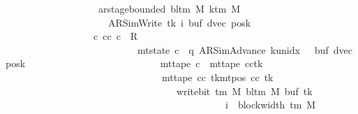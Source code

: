 \begin{isabellebody}
\ \ \ \ \ \ \ \ \ \ \ \ \ \ \ \ \ \ \ ar{\isacharunderscore}{\kern0pt}stage{\isacharunderscore}{\kern0pt}bounded\ {\isacharparenleft}{\kern0pt}bl{\isacharunderscore}{\kern0pt}tm\ M{\isacharparenright}{\kern0pt}\ {\isacharparenleft}{\kern0pt}k{\isacharunderscore}{\kern0pt}tm\ M{\isacharparenright}{\kern0pt}\isanewline
\ \ \ \ \ \ \ \ \ \ \ \ \ \ \ \ \ \ \ \ \ {\isacharparenleft}{\kern0pt}AR{\isacharunderscore}{\kern0pt}SimWrite{\isacharcomma}{\kern0pt}\ tk{\isacharcomma}{\kern0pt}\ i{\isacharcomma}{\kern0pt}\ buf{\isacharcomma}{\kern0pt}\ dvec{\isacharcomma}{\kern0pt}\ posk{\isacharparenright}{\kern0pt}\ {\isasymrbrakk}\isanewline
\ \ \ \ \ \ \ \ \ \ \ \ \ \ \ \ \ {\isasymLongrightarrow}\ {\isasymexists}c{\isacharprime}{\kern0pt}{\isacharprime}{\kern0pt}{\isachardot}{\kern0pt}\ {\isacharparenleft}{\kern0pt}cc{\isacharcomma}{\kern0pt}\ c{\isacharprime}{\kern0pt}{\isacharprime}{\kern0pt}{\isacharparenright}{\kern0pt}\ {\isasymin}\ R{\isacharprime}{\kern0pt}\isanewline
\ \ \ \ \ \ \ \ \ \ \ \ \ \ \ \ \ \ \ \ \ \ \ \ \ \ {\isasymand}\ mt{\isacharunderscore}{\kern0pt}state\ c{\isacharprime}{\kern0pt}{\isacharprime}{\kern0pt}\ {\isacharequal}{\kern0pt}\ {\isacharparenleft}{\kern0pt}q{\isacharcomma}{\kern0pt}\ AR{\isacharunderscore}{\kern0pt}SimAdvance{\isacharcomma}{\kern0pt}\ k{\isacharunderscore}{\kern0pt}unidx\ {}{\isacharcomma}{\kern0pt}\ {}{\isacharcomma}{\kern0pt}\ buf{\isacharcomma}{\kern0pt}\ dvec{\isacharcomma}{\kern0pt}\ posk{\isacharparenright}{\kern0pt}\isanewline
\ \ \ \ \ \ \ \ \ \ \ \ \ \ \ \ \ \ \ \ \ \ \ \ \ \ {\isasymand}\ mt{\isacharunderscore}{\kern0pt}tape\ c{\isacharprime}{\kern0pt}{\isacharprime}{\kern0pt}\ {\isacharequal}{\kern0pt}\ {\isacharparenleft}{\kern0pt}mt{\isacharunderscore}{\kern0pt}tape\ cc{\isacharparenright}{\kern0pt}{\isacharparenleft}{\kern0pt}tk\ {\isacharcolon}{\kern0pt}{\isacharequal}{\kern0pt}\isanewline
\ \ \ \ \ \ \ \ \ \ \ \ \ \ \ \ \ \ \ \ \ \ \ \ \ \ \ \ \ \ \ \ {\isacharparenleft}{\kern0pt}mt{\isacharunderscore}{\kern0pt}tape\ cc\ tk{\isacharparenright}{\kern0pt}{\isacharparenleft}{\kern0pt}mt{\isacharunderscore}{\kern0pt}pos\ cc\ tk\ {\isacharcolon}{\kern0pt}{\isacharequal}{\kern0pt}\isanewline
\ \ \ \ \ \ \ \ \ \ \ \ \ \ \ \ \ \ \ \ \ \ \ \ \ \ \ \ \ \ \ \ \ \ \ write{\isacharunderscore}{\kern0pt}bit\ {\isacharparenleft}{\kern0pt}{\isasymGamma}{\isacharunderscore}{\kern0pt}tm\ M{\isacharparenright}{\kern0pt}\ {\isacharparenleft}{\kern0pt}bl{\isacharunderscore}{\kern0pt}tm\ M{\isacharparenright}{\kern0pt}\ {\isacharparenleft}{\kern0pt}buf\ tk{\isacharparenright}{\kern0pt}\isanewline
\ \ \ \ \ \ \ \ \ \ \ \ \ \ \ \ \ \ \ \ \ \ \ \ \ \ \ \ \ \ \ \ \ \ \ \ \ \ \ \ \ \ \ \ \ {\isacharparenleft}{\kern0pt}i\ {\isacharminus}{\kern0pt}\ block{\isacharunderscore}{\kern0pt}width\ {\isacharparenleft}{\kern0pt}{\isasymGamma}{\isacharunderscore}{\kern0pt}tm\ M{\isacharparenright}{\kern0pt}{\isacharparenright}{\kern0pt}{\isacharparenright}{\kern0pt}{\isacharparenright}{\kern0pt}\isanewline

\end{isabellebody}
